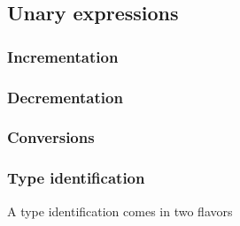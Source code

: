 \documentclass[letter,11pt]{article}
\begin{document}
\subsection{Unary expressions}
\label{sec:interface:unary-expr}

\subsubsection{Incrementation}

\subsubsection{Decrementation}

\subsubsection{Conversions}

\subsubsection{Type identification}

A type identification comes in two flavors
\end{document}

